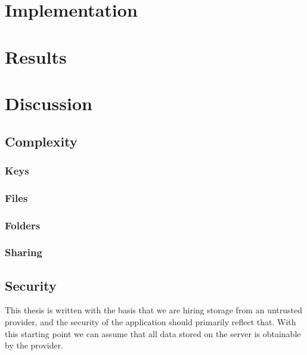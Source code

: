 \documentclass[pdftex,english,10pt,b5paper,twoside]{book}
\begin{document}
\chapter{Implementation}

\chapter{Results}

\chapter{Discussion}
\section{Complexity}

\subsection{Keys}

\subsection{Files}

\subsection{Folders}

\subsection{Sharing}

\section{Security}
This thesis is written with the basis that we are hiring storage from an
untrusted provider, and the security of the application should primarily
reflect that. With this starting point we can assume that all data stored on
the server is obtainable by the provider. 
\end{document}
